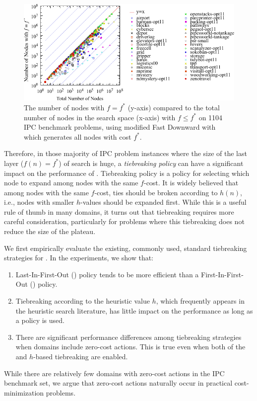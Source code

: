 \begin{figure}[htbp]
  \centering
  \includegraphics{tables/aaai16-frontier/aaai16prelim3/lmcut_frontier_noh-front.pdf}
 \caption{
 The number of nodes with $f=f^*$ (y-axis) compared to the
 total number of nodes in the search space (x-axis) with $f\leq f^*$ on 1104 IPC benchmark problems,
  using modified Fast Downward with \lmcut which 
  generates all nodes with cost $f^*$.
  }
 \label{fig:plateau-noh}
\end{figure}

Therefore, in those majority of IPC problem instances where the size of
the last layer ($f(n)=f^*$) of search is huge, a
\emph{tiebreaking policy} can have a significant impact on the
performance of \astar. Tiebreaking policy is a policy 
for selecting which node to expand among nodes with the same $f$-cost.
It is widely believed that among nodes with the same $f$-cost,
ties should be broken according to $h(n)$, i.e.,
nodes with smaller $h$-values should be expanded first.  While this is a
useful rule of thumb in many domains, it turns out that tiebreaking
requires more careful consideration, particularly for problems where
this tiebreaking does not reduce the size of the plateau.

We first empirically evaluate the existing, commonly used, standard
tiebreaking strategies for \astar.
In the experiments, we show that:
\begin{enumerate}
 \item Last-In-First-Out (\lifo) policy tends to be more efficient
       than a First-In-First-Out (\fifo) policy.
 \item Tiebreaking according to the heuristic value $h$, which
       frequently appears in the heuristic search literature, has little
       impact on the performance as long as a \lifo policy is used.
 \item There are significant performance differences among tiebreaking strategies
       when domains include zero-cost actions. This is true even when
       both of the \lifo and $h$-based tiebreaking are enabled.
\end{enumerate}
While there are relatively few domains with zero-cost actions in the
IPC benchmark set, we argue that zero-cost actions naturally occur in 
practical cost-minimization problems.

